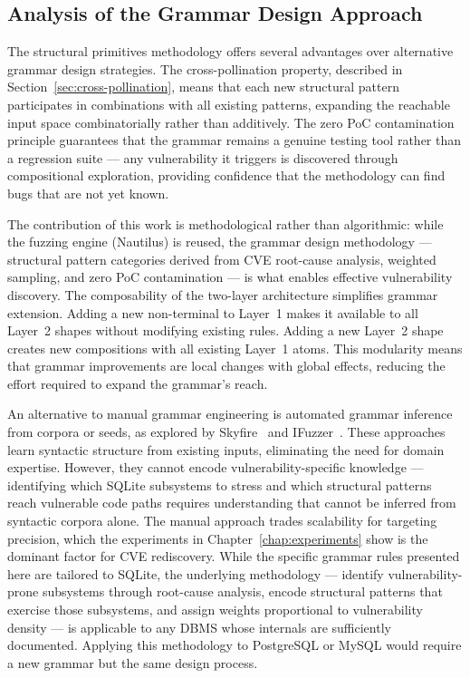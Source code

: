 \subsection{Analysis of the Grammar Design Approach}
\label{sec:grammar-analysis}

The structural primitives methodology offers several advantages over alternative grammar design strategies. The cross-pollination property, described in Section~\ref{sec:cross-pollination}, means that each new structural pattern participates in combinations with all existing patterns, expanding the reachable input space combinatorially rather than additively. The zero PoC contamination principle guarantees that the grammar remains a genuine testing tool rather than a regression suite --- any vulnerability it triggers is discovered through compositional exploration, providing confidence that the methodology can find bugs that are not yet known.

The contribution of this work is methodological rather than algorithmic: while the fuzzing engine (Nautilus) is reused, the grammar design methodology --- structural pattern categories derived from CVE root-cause analysis, weighted sampling, and zero PoC contamination --- is what enables effective vulnerability discovery. The composability of the two-layer architecture simplifies grammar extension. Adding a new non-terminal to Layer~1 makes it available to all Layer~2 shapes without modifying existing rules. Adding a new Layer~2 shape creates new compositions with all existing Layer~1 atoms. This modularity means that grammar improvements are local changes with global effects, reducing the effort required to expand the grammar's reach.

An alternative to manual grammar engineering is automated grammar inference from corpora or seeds, as explored by Skyfire~\citep{skyfire} and IFuzzer~\citep{ifuzzer}. These approaches learn syntactic structure from existing inputs, eliminating the need for domain expertise. However, they cannot encode vulnerability-specific knowledge --- identifying which SQLite subsystems to stress and which structural patterns reach vulnerable code paths requires understanding that cannot be inferred from syntactic corpora alone. The manual approach trades scalability for targeting precision, which the experiments in Chapter~\ref{chap:experiments} show is the dominant factor for CVE rediscovery. While the specific grammar rules presented here are tailored to SQLite, the underlying methodology --- identify vulnerability-prone subsystems through root-cause analysis, encode structural patterns that exercise those subsystems, and assign weights proportional to vulnerability density --- is applicable to any DBMS whose internals are sufficiently documented. Applying this methodology to PostgreSQL or MySQL would require a new grammar but the same design process.

